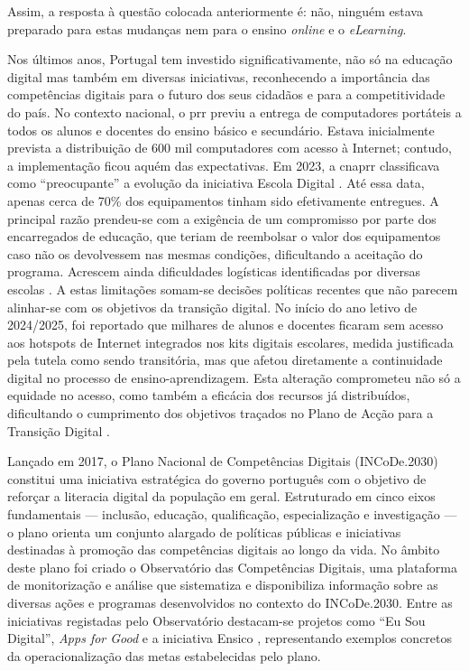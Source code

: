 Assim, a resposta à questão colocada anteriormente é: não, ninguém estava preparado para estas mudanças nem para o ensino \textit{online} e o \textit{eLearning}.

Nos últimos anos, Portugal tem investido significativamente, não só na educação digital mas também em diversas iniciativas, reconhecendo a importância das competências digitais para o futuro dos seus cidadãos e para a competitividade do país. No contexto nacional, o \acrfull{prr} previu a entrega de computadores portáteis a todos os alunos e docentes do ensino básico e secundário. Estava inicialmente prevista a distribuição de 600 mil computadores com acesso à Internet; contudo, a implementação ficou aquém das expectativas. Em 2023, a \acrfull{cnaprr} classificava como ``preocupante'' a evolução da iniciativa Escola Digital \cite{PRREntregacomputadores}. Até essa data, apenas cerca de 70\% dos equipamentos tinham sido efetivamente entregues. A principal razão prendeu-se com a exigência de um compromisso por parte dos encarregados de educação, que teriam de reembolsar o valor dos equipamentos caso não os devolvessem nas mesmas condições, dificultando a aceitação do programa. Acrescem ainda dificuldades logísticas identificadas por diversas escolas \cite{PRREntregacomputadores}. A estas limitações somam-se decisões políticas recentes que não parecem alinhar-se com os objetivos da transição digital. No início do ano letivo de 2024/2025, foi reportado que milhares de alunos e docentes ficaram sem acesso aos hotspots de Internet integrados nos kits digitais escolares, medida justificada pela tutela como sendo transitória, mas que afetou diretamente a continuidade digital no processo de ensino-aprendizagem. Esta alteração comprometeu não só a equidade no acesso, como também a eficácia dos recursos já distribuídos, dificultando o cumprimento dos objetivos traçados no Plano de Acção para a Transição Digital \cite{ExecutiveDigest2024}.

Lançado em 2017, o Plano Nacional de Competências Digitais (INCoDe.2030) \cite{incode2030} constitui uma iniciativa estratégica do governo português com o objetivo de reforçar a literacia digital da população em geral. Estruturado em cinco eixos fundamentais — inclusão, educação, qualificação, especialização e investigação — o plano orienta um conjunto alargado de políticas públicas e iniciativas destinadas à promoção das competências digitais ao longo da vida. No âmbito deste plano foi criado o Observatório das Competências Digitais, uma plataforma de monitorização e análise que sistematiza e disponibiliza informação sobre as diversas ações e programas desenvolvidos no contexto do INCoDe.2030. Entre as iniciativas registadas pelo Observatório destacam-se projetos como “Eu Sou Digital”, \textit{Apps for Good} e a iniciativa Ensico \cite{observatorio2030}, representando exemplos concretos da operacionalização das metas estabelecidas pelo plano.

